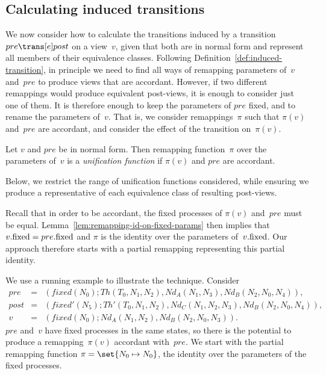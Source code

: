 \subsection{Calculating induced transitions}
\label{ssec:induced-symmetry}

We now consider how to calculate the transitions induced
by a transition $pre \trans[e] post$ on a view~$v$, given that both are in
normal form and represent all members of their equivalence classes.  
%
Following Definition~\ref{def:induced-transition}, in principle we need to
find all ways of remapping parameters of~$v$ and~$pre$ to produce views that
are accordant.  However, if two different remappings would produce equivalent
post-views, it is enough to consider just one of them.  It is therefore enough
to keep the parameters of $pre$ fixed, and to rename the parameters of~$v$.
That is, we consider remappings~$\pi$ such that $\pi(v)$ and~$pre$ are
accordant, and consider the effect of the transition on~$\pi(v)$.
%
\begin{definition}
Let $v$ and $pre$ be in normal form.  Then remapping function~$\pi$ over the
parameters of~$v$ is a \emph{unification function} if $\pi(v)$ and $pre$ are
accordant.
\end{definition}
%
Below, we restrict the range of unification functions considered, while
ensuring we produce a representative of each equivalence class of resulting
post-views.

Recall that in order to be accordant, the fixed processes of $\pi(v)$
and~$pre$ must be equal.  Lemma~\ref{lem:remapping-id-on-fixed-params} then
implies that $v.\mathrm{fixed} = pre.\mathrm{fixed}$ and $\pi$ is the identity over the
parameters of~$v.\mathrm{fixed}$.  Our approach therefore starts with a partial
remapping representing this partial identity.


\begin{example}
We use a running example to illustrate the technique.  Consider
\begin{eqnarray*}
pre & = &
   (fixed(N_0); Th(T_0, N_1, N_2), Nd_A(N_1, N_3), Nd_B(N_2, N_0, N_4)), 
\\
post & = & 
  (fixed'(N_5); Th'(T_0, N_1, N_2), Nd_C(N_1, N_2, N_3), Nd_B(N_2, N_0, N_4)) ,
\\
v & = & 
  (fixed(N_0); Nd_A(N_1, N_2), Nd_B(N_2, N_0, N_3)).
\end{eqnarray*}
%
$pre$ and~$v$ have fixed processes in the same states, so there is the
potential to produce a remapping~$\pi(v)$ accordant with~$pre$.  We start with
the partial remapping function $\pi = \set{N_0 \mapsto N_0}$, the identity over
the parameters of the fixed processes.
\end{example}

